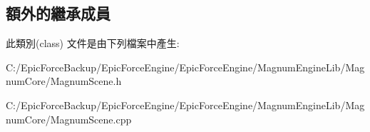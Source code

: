 \subsection*{額外的繼承成員}


此類別(class) 文件是由下列檔案中產生\+:\begin{DoxyCompactItemize}
\item 
C\+:/\+Epic\+Force\+Backup/\+Epic\+Force\+Engine/\+Epic\+Force\+Engine/\+Magnum\+Engine\+Lib/\+Magnum\+Core/Magnum\+Scene.\+h\item 
C\+:/\+Epic\+Force\+Backup/\+Epic\+Force\+Engine/\+Epic\+Force\+Engine/\+Magnum\+Engine\+Lib/\+Magnum\+Core/Magnum\+Scene.\+cpp\end{DoxyCompactItemize}
